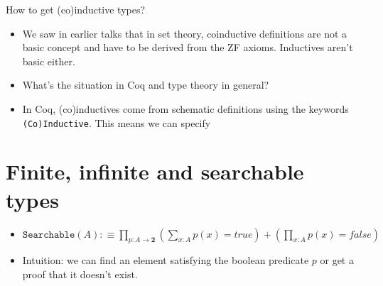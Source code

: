 \documentclass{beamer}
\begin{document}
\begin{frame}{How to get (co)inductive types?}
\begin{itemize}
	\item We saw in earlier talks that in set theory, coinductive definitions are not a basic concept and have to be derived from the ZF axioms. Inductives aren't basic either.
	\item What's the situation in Coq and type theory in general?
	\item In Coq, (co)inductives come from schematic definitions using the keywords \texttt{(Co)Inductive}. This means we can specify 
\end{itemize}
\end{frame}

\section{Finite, infinite and searchable types}

\begin{frame}{}
\begin{itemize}
	\item $\displaystyle \texttt{Searchable}(A) :\equiv \prod_{p : A \to \mathbf{2}} \left(\sum_{x : A} p(x) = true\right) + \left(\prod_{x : A} p(x) = false\right)$
	\item Intuition: we can find an element satisfying the boolean predicate $p$ or get a proof that it doesn't exist.
\end{itemize}
\end{frame}
\end{document}
